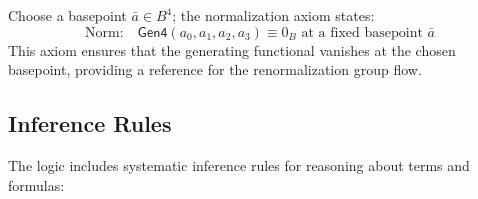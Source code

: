 \begin{definition}
\label{def:normalization-axiom}
Choose a basepoint $\bar{a} \in B^4$; the normalization axiom states:
\[
\text{Norm:} \quad \mathsf{Gen4}(a_0, a_1, a_2, a_3) \equiv 0_B \text{ at a fixed basepoint } \bar{a}
\]
This axiom ensures that the generating functional vanishes at the chosen basepoint, providing a reference for the renormalization group flow.
\end{definition}

\subsection{Inference Rules}

The logic includes systematic inference rules for reasoning about terms and formulas:


